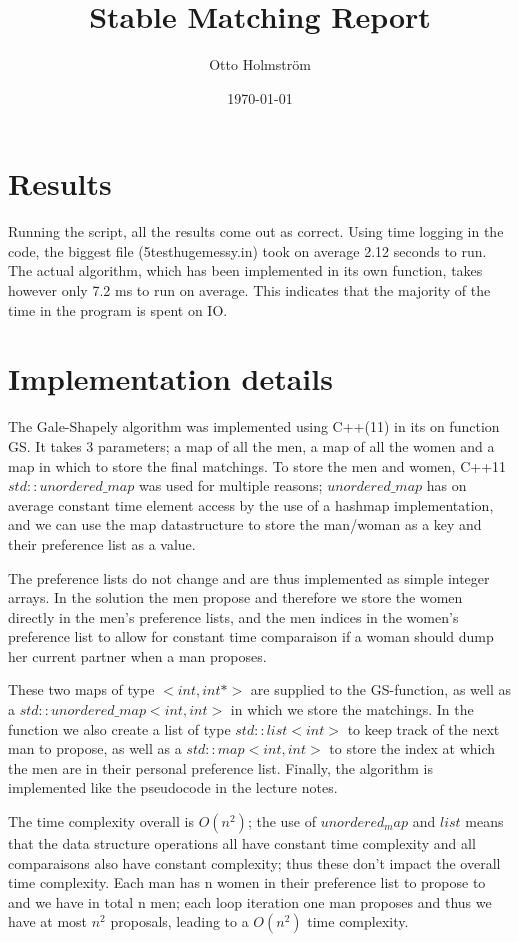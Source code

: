 \documentclass{article}
\title{Stable Matching Report}
\author{Otto Holmström}
\date{\today}
\begin{document}
  \maketitle

  \section{Results}
Running the script, all the results come out as correct. Using time logging in the code, the biggest file (5testhugemessy.in) took on average 2.12 seconds to run. The actual algorithm, which has been implemented in its own function, takes however only 7.2 ms to run on average. This indicates that the majority of the time in the program is spent on IO.


  \section{Implementation details}


The Gale-Shapely algorithm was implemented using C++(11) in its on function GS. It takes 3 parameters; a map of all the men, a map of all the women and a map in which to store the final matchings. To store the men and women, C++11 $std::unordered\_map$ was used for multiple reasons; $unordered\_map$ has on average constant time element access by the use of a hashmap implementation, and we can use the map datastructure to store the man/woman as a key and their preference list as a value. 

The preference lists do not change and are thus implemented as simple integer arrays. In the solution the men propose and therefore we store the women directly in the men's preference lists, and the men indices in the women's preference list to allow for constant time comparaison if a woman should dump her current partner when a man proposes.

These two maps of type $<int, int * >$ are supplied to the GS-function, as well as a $std::unordered\_map<int, int>$ in which we store the matchings. In the function we also create a list of type $std::list<int>$ to keep track of the next man to propose, as well as a $std::map<int, int>$ to store the index at which the men are in their personal preference list. Finally, the algorithm is implemented like the pseudocode in the lecture notes.

The time complexity overall is $O(n^2)$; the use of $unordered_map$ and $list$ means that the data structure operations all have constant time complexity and all comparaisons also have constant complexity; thus these don't impact the overall time complexity. Each man has n women in their preference list to propose to and we have in total n men; each loop iteration one man proposes and thus we have at most $n^2$ proposals, leading to a $O(n^2)$ time complexity.
\end{document}
